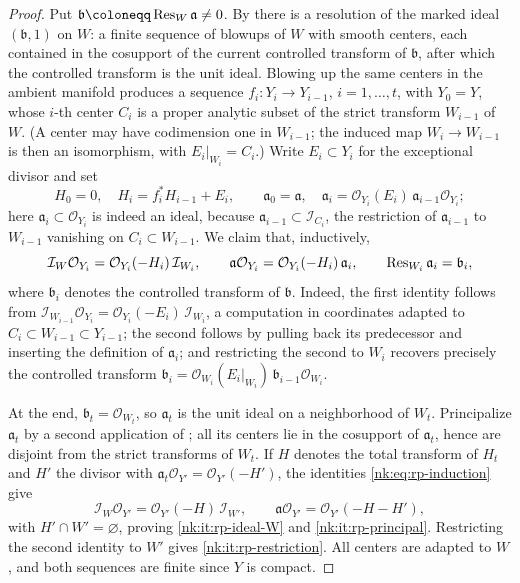 \begin{proof}
Put $\mathfrak b\coloneqq \NkRes W\mathfrak a\ne0$. By \cite[Theorem~1.3]{BM08}
there is a resolution of the marked ideal $(\mathfrak b,1)$ on $W$: a
finite sequence of blowups of $W$ with smooth centers, each contained
in the cosupport of the current controlled transform of $\mathfrak b$,
after which the controlled transform is the unit ideal. Blowing up the
same centers in the ambient manifold produces a sequence
$f_i\colon Y_i\to Y_{i-1}$, $i=1,\dots,t$, with $Y_0=Y$, whose
$i$-th center $C_i$ is a proper analytic subset of the strict
transform $W_{i-1}$ of $W$. (A center may have codimension one in
$W_{i-1}$; the induced map $W_i\to W_{i-1}$ is then an isomorphism,
with $E_i|_{W_i}=C_i$.) Write $E_i\subset Y_i$ for the exceptional
divisor and set
\[
  H_0=0,\quad H_i=f_i^*H_{i-1}+E_i,\qquad
  \mathfrak a_0=\mathfrak a,\quad
  \mathfrak a_i=\mathcal O_{Y_i}(E_i)\,\mathfrak a_{i-1}\mathcal O_{Y_i};
\]
here $\mathfrak a_i\subset\mathcal O_{Y_i}$ is indeed an ideal, because
$\mathfrak a_{i-1}\subset\mathcal I_{C_i}$, the restriction of
$\mathfrak a_{i-1}$ to $W_{i-1}$ vanishing on $C_i\subset W_{i-1}$.
We claim that, inductively,
\begin{equation}\label{nk:eq:rp-induction}
  \mathcal I_W\mathcal O_{Y_i}=\mathcal O_{Y_i}(-H_i)\,\mathcal I_{W_i},\qquad
  \mathfrak a\mathcal O_{Y_i}=\mathcal O_{Y_i}(-H_i)\,\mathfrak a_i,\qquad
  \operatorname{Res}_{W_i}\mathfrak a_i=\mathfrak b_i,
\end{equation}
where $\mathfrak b_i$ denotes the controlled transform of
$\mathfrak b$. Indeed, the first identity follows from
$\mathcal I_{W_{i-1}}\mathcal O_{Y_i}=\mathcal O_{Y_i}(-E_i)\,\mathcal I_{W_i}$, a computation in
coordinates adapted to $C_i\subset W_{i-1}\subset Y_{i-1}$; the second
follows by pulling back its predecessor and inserting the definition of
$\mathfrak a_i$; and restricting the second to $W_i$ recovers
precisely the controlled transform
$\mathfrak b_i=\mathcal O_{W_i}(E_i|_{W_i})\,\mathfrak b_{i-1}\mathcal O_{W_i}$.

At the end, $\mathfrak b_t=\mathcal O_{W_t}$, so $\mathfrak a_t$ is the unit
ideal on a neighborhood of $W_t$. Principalize $\mathfrak a_t$ by a
second application of \cite[Theorem~1.3]{BM08}; all its centers lie in
the cosupport of $\mathfrak a_t$, hence are disjoint from the strict
transforms of $W_t$. If $H$ denotes the total transform of $H_t$
and $H'$ the divisor with $\mathfrak a_t\mathcal O_{Y'}=\mathcal O_{Y'}(-H')$, the
identities \eqref{nk:eq:rp-induction} give
\[
  \mathcal I_W\mathcal O_{Y'}=\mathcal O_{Y'}(-H)\,\mathcal I_{W'},\qquad
  \mathfrak a\mathcal O_{Y'}=\mathcal O_{Y'}(-H-H'),
\]
with $H'\cap W'=\varnothing$, proving \ref{nk:it:rp-ideal-W} and
\ref{nk:it:rp-principal}. Restricting the second identity to $W'$ gives
\ref{nk:it:rp-restriction}. All centers are adapted to $W$, and both
sequences are finite since $Y$ is compact.
\end{proof}

